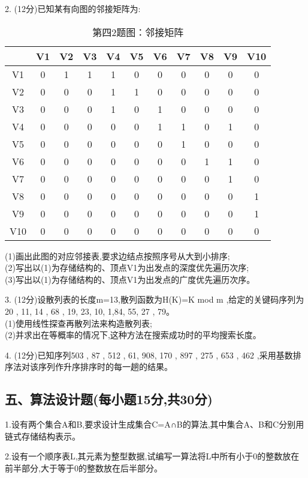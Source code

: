2. (12分)已知某有向图的邻接矩阵为:
\begin{table}[ht]
\centering
\caption{第四2题图：邻接矩阵}\label{tab_ZSDS13_1}
\begin{tabular}{|c|c|c|c|c|c|c|c|c|c|c|}
\hline
 & V1 & V2 & V3 & V4 & V5 & V6 & V7 & V8 & V9 & V10 \\
\hline
V1 & 0 & 1 & 1 & 1 & 0 & 0 & 0 & 0 & 0 & 0 \\
\hline
V2 & 0 & 0 & 0 & 1 & 1 & 0 & 0 & 0 & 0 & 0 \\
\hline
V3 & 0 & 0 & 0 & 1 & 0 & 1 & 0 & 0 & 0 & 0 \\
\hline
V4 & 0 & 0 & 0 & 0 & 0 & 1 & 1 & 0 & 1 & 0 \\
\hline
V5 & 0 & 0 & 0 & 0 & 0 & 0 & 1 & 0 & 0 & 0 \\
\hline
V6 & 0 & 0 & 0 & 0 & 0 & 0 & 0 & 1 & 1 & 0 \\
\hline
V7 & 0 & 0 & 0 & 0 & 0 & 0 & 0 & 0 & 1 & 0 \\
\hline
V8 & 0 & 0 & 0 & 0 & 0 & 0 & 0 & 0 & 0 & 1 \\
\hline
V9 & 0 & 0 & 0 & 0 & 0 & 0 & 0 & 0 & 0 & 1 \\
\hline
V10 & 0 & 0 & 0 & 0 & 0 & 0 & 0 & 0 & 0 & 0 \\
\hline
\end{tabular}
\end{table}
(1)画出此图的对应邻接表,要求边结点按照序号从大到小排序; \\
(2)写出以(1)为存储结构的、顶点V1为出发点的深度优先遍历次序; \\
(3)写出以(1)为存储结构的、顶点V1为出发点的广度优先遍历次序。

3. (12分)设散列表的长度m=13,散列函数为H(K)=K mod m ,给定的关键码序列为20 , 11, 14 , 68 , 19, 23, 10, 1,84, 55, 27 , 79。 \\
(1)使用线性探查再散列法来构造散列表; \\
(2)并求出在等概率的情况下,这种方法在搜索成功时的平均搜索长度。

4. (12分)已知序列{503 , 87 , 512 , 61, 908, 170 , 897 , 275 , 653 , 462} ,采用基数排序法对该序列作升序排序时的每一趟的结果。

\subsection{五、算法设计题(每小题15分,共30分)}

1.设有两个集合A和B,要求设计生成集合C=A∩B的算法,其中集合A、B和C分别用链式存储结构表示。

2.设有一个顺序表L,其元素为整型数据,试编写一算法将L中所有小于0的整数放在前半部分,大于等于0的整数放在后半部分。
